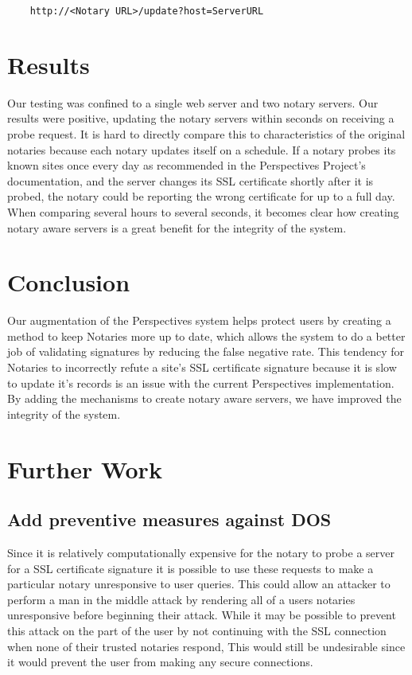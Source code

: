 \documentclass[preprint,review,12pt]{elsarticle}
\begin{document}
\begin{verbatim}
    http://<Notary URL>/update?host=ServerURL
\end{verbatim}



\section{Results}
\label{results}

Our testing was confined to a single web server and two notary servers. Our
results were positive, updating the notary servers within seconds on receiving
a probe request. It is hard to directly compare this to characteristics of the
original notaries because each notary updates itself on a schedule. If a notary
probes its known sites once every day as recommended in the Perspectives Project's
documentation, and the server changes its SSL certificate shortly after it is 
probed, the notary could be reporting the wrong certificate for up to a full day.
When comparing several hours to several seconds, it becomes clear how creating 
notary aware servers is a great benefit for the integrity of the system.

\section{Conclusion}
\label{conclusion}

Our augmentation of the Perspectives system helps protect users by creating a
method to keep Notaries more up to date, which allows the system to do a better
job of validating signatures by reducing the false negative rate. This tendency
for Notaries to incorrectly refute a site's SSL certificate signature because
it is slow to update it's records is an issue with the current Perspectives
implementation. By adding the mechanisms to create notary aware servers, we
have improved the integrity of the system.

\section{Further Work}
\label{further work}

\subsection{Add preventive measures against DOS}

Since it is relatively computationally expensive for the notary to probe a
server for a SSL certificate signature it is possible to use these requests to
make a particular notary unresponsive to user queries. This could allow an
attacker to perform a man in the middle attack by rendering all of a users
notaries unresponsive before beginning their attack. While it may be possible
to prevent this attack on the part of the user by not continuing with the SSL
connection when none of their trusted notaries respond, This would still be
undesirable since it would prevent the user from making any secure connections.
\end{document}
